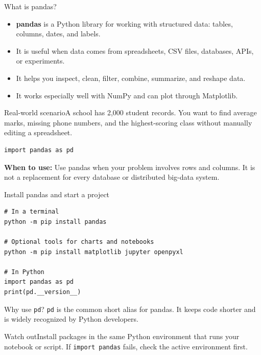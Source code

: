 \documentclass[aspectratio=169,10pt]{beamer}
\newcommand{\scenario}[1]{\begin{block}{Real-world scenario}#1\end{block}}
\newcommand{\whenuse}[1]{\textcolor{CodeGreen}{\textbf{When to use:}} #1}
\newcommand{\pitfall}[1]{\begin{alertblock}{Watch out}#1\end{alertblock}}
\begin{document}
\begin{frame}[fragile]{What is pandas?}
\begin{itemize}
\item \textbf{pandas} is a Python library for working with structured data: tables, columns, dates, and labels.
\item It is useful when data comes from spreadsheets, CSV files, databases, APIs, or experiments.
\item It helps you inspect, clean, filter, combine, summarize, and reshape data.
\item It works especially well with NumPy and can plot through Matplotlib.
\end{itemize}
\scenario{A school has 2,000 student records. You want to find average marks, missing phone numbers, and the highest-scoring class without manually editing a spreadsheet.}
\begin{lstlisting}
import pandas as pd
\end{lstlisting}
\whenuse{Use pandas when your problem involves rows and columns. It is not a replacement for every database or distributed big-data system.}
\end{frame}

\begin{frame}[fragile]{Install pandas and start a project}
\begin{lstlisting}
# In a terminal
python -m pip install pandas

# Optional tools for charts and notebooks
python -m pip install matplotlib jupyter openpyxl

# In Python
import pandas as pd
print(pd.__version__)
\end{lstlisting}
\begin{block}{Why use \texttt{pd}?}
\texttt{pd} is the common short alias for pandas. It keeps code shorter and is widely recognized by Python developers.
\end{block}
\pitfall{Install packages in the same Python environment that runs your notebook or script. If \texttt{import pandas} fails, check the active environment first.}
\end{frame}
\end{document}
